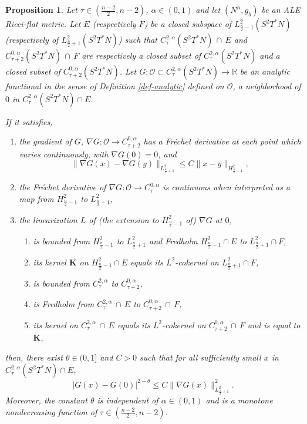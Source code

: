 \documentclass[a4paper,11pt,reqno]{amsart}
\newtheorem{prop}[defn]{Proposition}
\def\RR{\mathbb{R}}
\numberwithin{equation}{section}
\begin{document}
	\begin{prop}\label{Lojasiewicz ineq weighted}
		Let $\tau\in(\frac{n-2}{2},n-2)$, $\alpha\in (0,1)$ and let $(N^n,g_b)$ be an ALE Ricci-flat metric. Let $E$ (respectively $F$) be a closed subspace of $L^2_{\frac{n}{2}-1}(S^2T^*N)$ (respectively of $L^2_{\frac{n}{2}+1}(S^2T^*N)$) such that $ C^{2,\alpha}_{\tau}(S^2T^*N)\,\cap\,E$ and $C^{0,\alpha}_{\tau+2}(S^2T^*N)\,\cap\,F$ are respectively a closed subset of $C^{2,\alpha}_{\tau}(S^2T^*N)$ and a closed subset of $C^{0,\alpha}_{\tau+2}(S^2T^*N)$. Let $G : \mathcal{O}\subset C^{2,\alpha}_{\tau}(S^2T^*N) \to \RR$ be an analytic functional in the sense of Definition \ref{def-analytic} defined on $\mathcal{O}$, a neighborhood of $0$ in $  C^{2,\alpha}_{\tau}(S^2T^*N)\cap E$.
		
		If it satisfies,
		\begin{enumerate}
			\item\label{item-0} the gradient of $G$, $\nabla G : \mathcal{O}\to C^{0,\alpha}_{\tau+2}$ has a Fr\'echet derivative at each point which varies continuously, with $\nabla G(0)=0$, and 
			\begin{equation}
			\big\|\nabla G(x)-\nabla G(y)\big\|_{L^2_{\frac{n}{2}+1}} \leq C\|x-y\|_{H^{2}_{\frac{n}{2}-1}},\label{lip-bd-nabla-G}
			\end{equation}
						\item \label{item-0-bis}the Fr\'echet derivative of $\nabla G:\mathcal{O}\rightarrow C^{0,\alpha}_{\tau}$ is continuous when interpreted as a map from $H^{2}_{\frac{n}{2}-1}$ to $L^2_{\frac{n}{2}+1}$,
			\item the linearization $L$ of (the extension to $H^2_{\frac{n}{2}-1}$ of) $\nabla G$ at $0$,
			\begin{enumerate}
				\item \label{item-1}is bounded from $H^{2}_{\frac{n}{2}-1}$ to $L^2_{\frac{n}{2}+1}$ and Fredholm $H^{2}_{\frac{n}{2}-1}\cap E$ to $L^2_{\frac{n}{2}+1}\cap F$,
				\item \label{item-2} its kernel $\mathbf{K}$ on $H^{2}_{\frac{n}{2}-1}\cap E$ equals its $L^2$-cokernel on $L^2_{\frac{n}{2}+1}\cap F$,
				\item \label{item-3} is bounded from $C^{2,\alpha}_{\tau}$ to $C^{0,\alpha}_{\tau+2}$,
				\item \label{item-4} is Fredholm from $C^{2,\alpha}_{\tau}\,\cap\, E$ to $C^{0,\alpha}_{\tau+2}\,\cap\, F$,
				\item \label{item-5} its kernel on $C^{2,\alpha}_\tau\,\cap \,E$ equals its $L^2$-cokernel on $C^{0,\alpha}_{\tau+2}\,\cap\,F$ and is equal to $\mathbf{K}$,
			\end{enumerate}
		\end{enumerate}
		then, there exist $\theta \in (0,1]$ and $C>0$ such that for all sufficiently small $x$ in $C^{2,\alpha}_{\tau}(S^2T^*N)\cap E$,
		\begin{equation*}
		|G(x)-G(0)|^{2-\theta}\leq C\|\nabla G(x)\|_{L^2_{\frac{n}{2}+1}}^{2}.
		\end{equation*}
		Moreover, the constant $\theta$ is independent of $\alpha\in(0,1)$ and is a monotone nondecreasing function of $\tau\in\left(\frac{n-2}{2},n-2\right)$.
	\end{prop}
\end{document}
